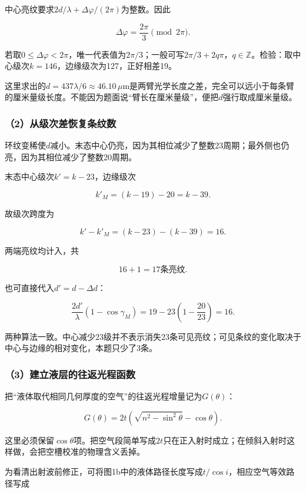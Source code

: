 \documentclass[12pt,a4paper,fontset=fandol]{ctexart}
\begin{document}
中心亮纹要求\(2d/\lambda+\Delta\varphi/(2\pi)\)为整数。因此

\[
\boxed{\Delta\varphi=\frac{2\pi}{3}\pmod{2\pi}}.
\]

若取\(0\leq\Delta\varphi<2\pi\)，唯一代表值为\(2\pi/3\)；一般可写\(2\pi/3+2q\pi\)，\(q\in\mathbb Z\)。检验：取中心级次\(k=146\)，边缘级次为127，正好相差19。

这里求出的\(d=437\lambda/6\approx46.10\,\mu\mathrm m\)是两臂光学长度之差，完全可以远小于每条臂的厘米量级长度。不能因为题面说``臂长在厘米量级''，便把\(d\)强行取成厘米量级。

\subsubsection{（2）从级次差恢复条纹数}\label{ux4eceux7ea7ux6b21ux5deeux6062ux590dux6761ux7eb9ux6570}

环纹变稀使\(d\)减小。末态中心仍亮，因为其相位减少了整数23周期；最外侧也仍亮，因为其相位减少了整数20周期。

末态中心级次\(k'=k-23\)，边缘级次

\[
k'_M=(k-19)-20=k-39.
\]

故级次跨度为

\[
k'-k'_M=(k-23)-(k-39)=16.
\]

两端亮纹均计入，共

\[
\boxed{16+1=17\text{条亮纹}}.
\]

也可直接代入\(d'=d-\Delta d\)：

\[
\frac{2d'}{\lambda}(1-\cos\gamma_M)
=19-23\left(1-\frac{20}{23}\right)=16.
\]

两种算法一致。中心减少23级并不表示消失23条可见亮纹；可见条纹的变化取决于中心与边缘的相对变化，本题只少了3条。

\subsubsection{（3）建立液层的往返光程函数}\label{ux5efaux7acbux6db2ux5c42ux7684ux5f80ux8fd4ux5149ux7a0bux51fdux6570}

把``液体取代相同几何厚度的空气''的往返光程增量记为\(G(\theta)\)：

\[
G(\theta)=2t\left(\sqrt{n^2-\sin^2\theta}-\cos\theta\right).
\]

这里必须保留\(\cos\theta\)项。把空气段简单写成\(2t\)只在正入射时成立；在倾斜入射时这样做，会把空槽校准的物理含义丢掉。

为看清出射波前修正，可将图1b中的液体路径长度写成\(t/\cos i\)，相应空气等效路径写成
\end{document}
